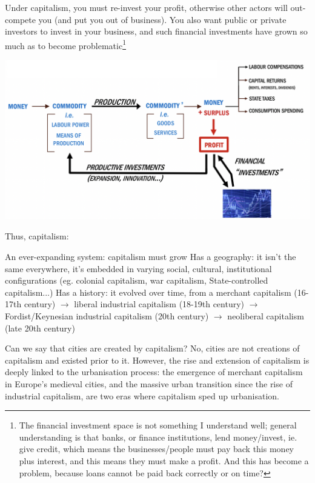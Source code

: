 \documentclass{article}
\begin{document}
Under capitalism, you must re-invest your profit, otherwise other actors will out-compete you (and put you out of business). You also want public or private investors to invest in your business, and such financial investments have grown so much as to become problematic\footnote{The financial investment space is not something I understand well; general understanding is that banks, or finance institutions, lend money/invest, ie. give credit, which means the businesses/people must pay back this money plus interest, and this means they must make a profit. And this has become a problem, because loans cannot be paid back correctly or on time?} 

\includegraphics[width=\textwidth]{capitalism}

Thus, capitalism:
\begin{outline}
	\1 An ever-expanding system: capitalism must grow
	\1 Has a geography: it isn't the same everywhere, it's embedded in varying social, cultural, institutional configurations (eg. colonial capitalism, war capitalism, State-controlled capitalism...)
	\1 Has a history: it evolved over time, from a merchant capitalism (16-17th century) $\rightarrow$ liberal industrial capitalism (18-19th century) $\rightarrow$ Fordist/Keynesian industrial capitalism (20th century) $\rightarrow$ neoliberal capitalism (late 20th century)
\end{outline}


Can we say that cities are created by capitalism? No, cities are not creations of capitalism and existed prior to it. However, the rise and extension of capitalism is deeply linked to the urbanisation process: the emergence of merchant capitalism in Europe's medieval cities, and the massive urban transition since the rise of industrial capitalism, are two eras where capitalism sped up urbanisation.
\end{document}
